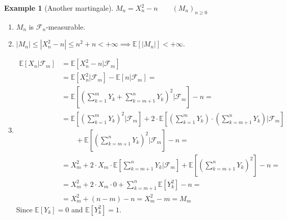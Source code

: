 \documentclass[10pt,a4paper]{article}
\theoremstyle{definition}
\newtheorem{exi}{Example}[section]
\begin{document}
\begin{exi}[Another martingale]
	$M_n=X^2_n-n \qquad(M_n)_{n\geq 0}$
	\begin{enumerate}
		\item $M_n$ is $\mathcal{F}_n$-measurable.
		\item $|M_n|\leq|X^2_n-n|\leq n^2+n<+\infty\implies\mathbb{E}[|M_n|]<+\infty$.
		\item 
		\begin{equation*}
			\begin{split}
				\mathbb{E}[X_n|\mathcal{F}_m]&=\mathbb{E}[X^2_n-n|\mathcal{F}_m]\\
				&=\mathbb{E}[X^2_n|\mathcal{F}_m]-\mathbb{E}[n|\mathcal{F}_m]=\\
				&=\mathbb{E}\left[ \left( \sum_{k=1}^{m}Y_k+\sum_{k=m+1}^{n}Y_k \right)  ^2|\mathcal{F}_m \right]  -n=\\
				&=\mathbb{E}\left[ \left( \sum_{k=1}^{m}Y_k \right)  ^2|\mathcal{F}_m \right]  +2\cdot\mathbb{E}\left[ \left( \sum_{k=1}^{m}Y_k \right)  \cdot\left( \sum_{k=m+1}^{n}Y_k \right)  |\mathcal{F}_m \right]  \\
				& \qquad +\mathbb{E}\left[ \left( \sum_{k=m+1}^{n}Y_k \right)  ^2|\mathcal{F}_m \right]  -n=\\
				&=X^2_m+2\cdot X_m\cdot \mathbb{E}\left[ \sum_{k=m+1}^{n}Y_k|\mathcal{F}_m \right]  +\mathbb{E}\left[ \left( \sum_{k=m+1}^{n}Y_k \right)  ^2 \right]  -n=\\
				&=X^2_m+2\cdot X_m\cdot0+\sum_{k=m+1}^{n}\mathbb{E}[Y_k^2]-n=\\
				&=X^2_m+(n-m)-n=X^2_m-m=M_m
			\end{split}			
		\end{equation*}
	Since $\mathbb{E}[Y_k]=0$ and $\mathbb{E}[Y_k^2]=1$.
	\end{enumerate}
\end{exi}
\end{document}
